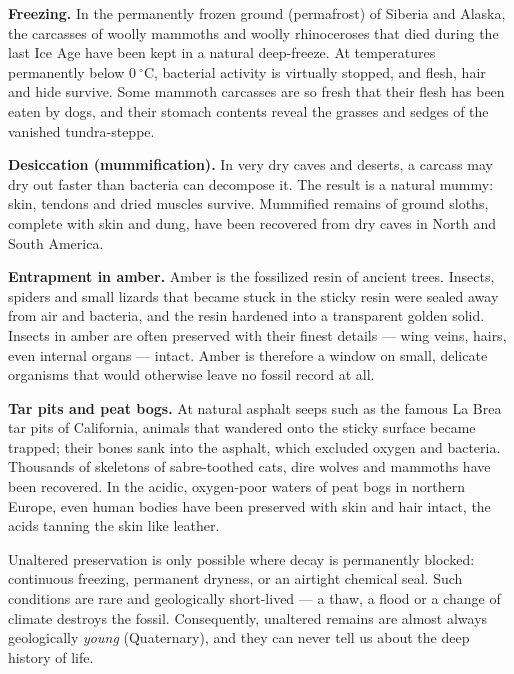 \documentclass[11pt]{article}
\newcommand{\cle}[1]{{\popxbold\color{popdark}#1}}
\begin{document}
\textbf{Freezing.} In the permanently frozen ground (\cle{permafrost}) of Siberia and Alaska, the carcasses of woolly mammoths and woolly rhinoceroses that died during the last Ice Age have been kept in a natural deep-freeze. At temperatures permanently below $0\ ^{\circ}\mathrm{C}$, bacterial activity is virtually stopped, and flesh, hair and hide survive. Some mammoth carcasses are so fresh that their flesh has been eaten by dogs, and their stomach contents reveal the grasses and sedges of the vanished tundra-steppe.

\textbf{Desiccation (mummification).} In very dry caves and deserts, a carcass may dry out faster than bacteria can decompose it. The result is a natural mummy: skin, tendons and dried muscles survive. Mummified remains of ground sloths, complete with skin and dung, have been recovered from dry caves in North and South America.

\textbf{Entrapment in amber.} \cle{Amber} is the fossilized resin of ancient trees. Insects, spiders and small lizards that became stuck in the sticky resin were sealed away from air and bacteria, and the resin hardened into a transparent golden solid. Insects in amber are often preserved with their finest details --- wing veins, hairs, even internal organs --- intact. Amber is therefore a window on small, delicate organisms that would otherwise leave no fossil record at all.

\textbf{Tar pits and peat bogs.} At natural asphalt seeps such as the famous La Brea tar pits of California, animals that wandered onto the sticky surface became trapped; their bones sank into the asphalt, which excluded oxygen and bacteria. Thousands of skeletons of sabre-toothed cats, dire wolves and mammoths have been recovered. In the acidic, oxygen-poor waters of peat bogs in northern Europe, even human bodies have been preserved with skin and hair intact, the acids tanning the skin like leather.

\begin{attention}
Unaltered preservation is only possible where decay is permanently blocked: continuous freezing, permanent dryness, or an airtight chemical seal. Such conditions are rare and geologically short-lived --- a thaw, a flood or a change of climate destroys the fossil. Consequently, unaltered remains are almost always geologically \emph{young} (Quaternary), and they can never tell us about the deep history of life.
\end{attention}
\end{document}
